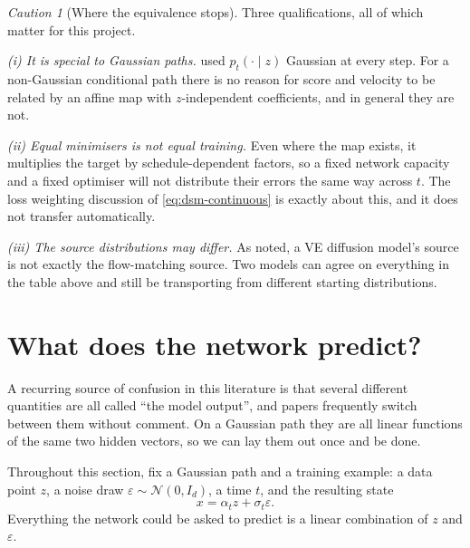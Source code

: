 \documentclass[11pt,a4paper]{report}
\theoremstyle{definition}
\theoremstyle{remark}
\newtheorem{caution}[caution]{Caution}
\begin{document}
\begin{caution}[Where the equivalence stops]
\label{caution:equivalence-limits}
Three qualifications, all of which matter for this project.

\emph{(i) It is special to Gaussian paths.}  used
$p_t(\cdot\mid z)$ Gaussian at every step. For a non-Gaussian conditional
path there is no reason for score and velocity to be related by an affine
map with $z$-independent coefficients, and in general they are not.

\emph{(ii) Equal minimisers is not equal training.} Even where the map
exists, it multiplies the target by schedule-dependent factors, so a fixed
network capacity and a fixed optimiser will not distribute their errors the
same way across $t$. The loss weighting discussion of
\eqref{eq:dsm-continuous} is exactly about this, and it does not transfer
automatically.

\emph{(iii) The source distributions may differ.} As
 noted, a VE diffusion model's source is not
exactly the flow-matching source. Two models can agree on everything in the
table above and still be transporting from different starting
distributions.
\end{caution}

\section{What does the network predict?}
\label{sec:parameterisations}

A recurring source of confusion in this literature is that several
different quantities are all called ``the model output'', and papers
frequently switch between them without comment. On a Gaussian path they are
all linear functions of the same two hidden vectors, so we can lay them out
once and be done.

Throughout this section, fix a Gaussian path and a training example: a data
point $z$, a noise draw $\varepsilon\sim\mathcal N(0,I_d)$, a time $t$, and
the resulting state
\[
x = \alpha_tz+\sigma_t\varepsilon .
\]
Everything the network could be asked to predict is a linear combination of
$z$ and $\varepsilon$.
\end{document}
